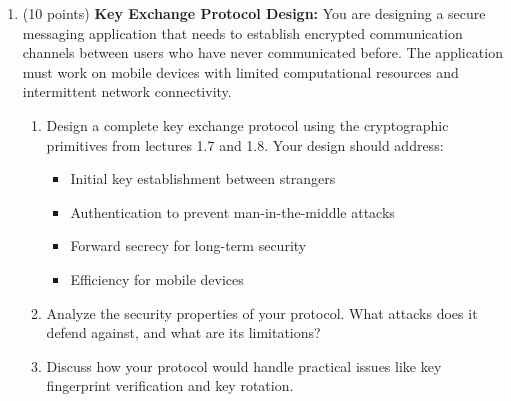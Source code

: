 \documentclass[10pt,a4paper,american]{article}
\begin{document}
\begin{enumerate}
	\item (10 points) \textbf{Key Exchange Protocol Design:}
	      You are designing a secure messaging application that needs to establish encrypted communication channels between users who have never communicated before. The application must work on mobile devices with limited computational resources and intermittent network connectivity.
	      \begin{enumerate}
		      \item Design a complete key exchange protocol using the cryptographic primitives from lectures 1.7 and 1.8. Your design should address:
		            \begin{itemize}
			            \item Initial key establishment between strangers
			            \item Authentication to prevent man-in-the-middle attacks
			            \item Forward secrecy for long-term security
			            \item Efficiency for mobile devices
		            \end{itemize}
		      \item Analyze the security properties of your protocol. What attacks does it defend against, and what are its limitations?
		      \item Discuss how your protocol would handle practical issues like key fingerprint verification and key rotation.
	      \end{enumerate}


\end{enumerate}
\end{document}
